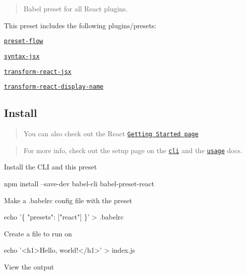 \begin{quote}
Babel preset for all React plugins. \end{quote}


This preset includes the following plugins/presets\+:


\begin{DoxyItemize}
\item \href{https://babeljs.io/docs/plugins/preset-flow/}{\tt preset-\/flow}
\item \href{https://babeljs.io/docs/plugins/syntax-jsx/}{\tt syntax-\/jsx}
\item \href{https://babeljs.io/docs/plugins/transform-react-jsx/}{\tt transform-\/react-\/jsx}
\item \href{https://babeljs.io/docs/plugins/transform-react-display-name/}{\tt transform-\/react-\/display-\/name}
\end{DoxyItemize}

\subsection*{Install}

\begin{quote}
You can also check out the React \href{https://facebook.github.io/react/docs/hello-world.html}{\tt Getting Started page} \end{quote}


\begin{quote}
For more info, check out the setup page on the \href{/docs/setup/}{\tt cli} and the \href{/docs/usage/cli/}{\tt usage} docs. \end{quote}


Install the C\+LI and this preset


\begin{DoxyCode}
npm install --save-dev babel-cli babel-preset-react
\end{DoxyCode}


Make a .babelrc config file with the preset


\begin{DoxyCode}
echo '\{ "presets": ["react"] \}' > .babelrc
\end{DoxyCode}


Create a file to run on


\begin{DoxyCode}
echo '<h1>Hello, world!</h1>' > index.js
\end{DoxyCode}


View the output


